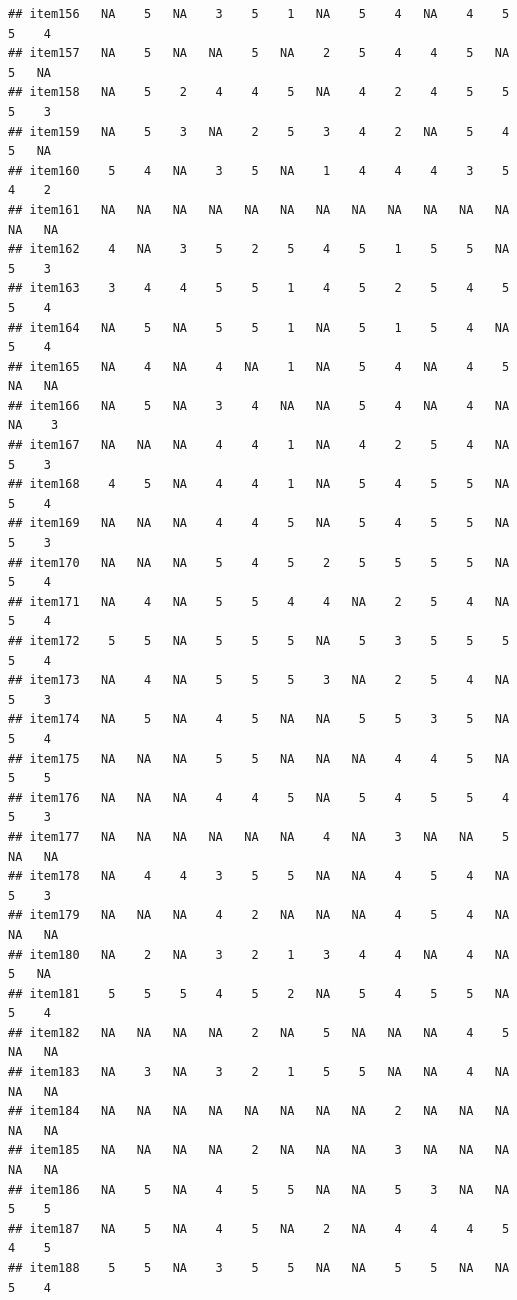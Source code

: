 \documentclass[
  man]{apa6}
\begin{document}
\begin{verbatim}
## item156   NA    5   NA    3    5    1   NA    5    4   NA    4    5    5    4
## item157   NA    5   NA   NA    5   NA    2    5    4    4    5   NA    5   NA
## item158   NA    5    2    4    4    5   NA    4    2    4    5    5    5    3
## item159   NA    5    3   NA    2    5    3    4    2   NA    5    4    5   NA
## item160    5    4   NA    3    5   NA    1    4    4    4    3    5    4    2
## item161   NA   NA   NA   NA   NA   NA   NA   NA   NA   NA   NA   NA   NA   NA
## item162    4   NA    3    5    2    5    4    5    1    5    5   NA    5    3
## item163    3    4    4    5    5    1    4    5    2    5    4    5    5    4
## item164   NA    5   NA    5    5    1   NA    5    1    5    4   NA    5    4
## item165   NA    4   NA    4   NA    1   NA    5    4   NA    4    5   NA   NA
## item166   NA    5   NA    3    4   NA   NA    5    4   NA    4   NA   NA    3
## item167   NA   NA   NA    4    4    1   NA    4    2    5    4   NA    5    3
## item168    4    5   NA    4    4    1   NA    5    4    5    5   NA    5    4
## item169   NA   NA   NA    4    4    5   NA    5    4    5    5   NA    5    3
## item170   NA   NA   NA    5    4    5    2    5    5    5    5   NA    5    4
## item171   NA    4   NA    5    5    4    4   NA    2    5    4   NA    5    4
## item172    5    5   NA    5    5    5   NA    5    3    5    5    5    5    4
## item173   NA    4   NA    5    5    5    3   NA    2    5    4   NA    5    3
## item174   NA    5   NA    4    5   NA   NA    5    5    3    5   NA    5    4
## item175   NA   NA   NA    5    5   NA   NA   NA    4    4    5   NA    5    5
## item176   NA   NA   NA    4    4    5   NA    5    4    5    5    4    5    3
## item177   NA   NA   NA   NA   NA   NA    4   NA    3   NA   NA    5   NA   NA
## item178   NA    4    4    3    5    5   NA   NA    4    5    4   NA    5    3
## item179   NA   NA   NA    4    2   NA   NA   NA    4    5    4   NA   NA   NA
## item180   NA    2   NA    3    2    1    3    4    4   NA    4   NA    5   NA
## item181    5    5    5    4    5    2   NA    5    4    5    5   NA    5    4
## item182   NA   NA   NA   NA    2   NA    5   NA   NA   NA    4    5   NA   NA
## item183   NA    3   NA    3    2    1    5    5   NA   NA    4   NA   NA   NA
## item184   NA   NA   NA   NA   NA   NA   NA   NA    2   NA   NA   NA   NA   NA
## item185   NA   NA   NA   NA    2   NA   NA   NA    3   NA   NA   NA   NA   NA
## item186   NA    5   NA    4    5    5   NA   NA    5    3   NA   NA    5    5
## item187   NA    5   NA    4    5   NA    2   NA    4    4    4    5    4    5
## item188    5    5   NA    3    5    5   NA   NA    5    5   NA   NA    5    4

\end{verbatim}
\end{document}

